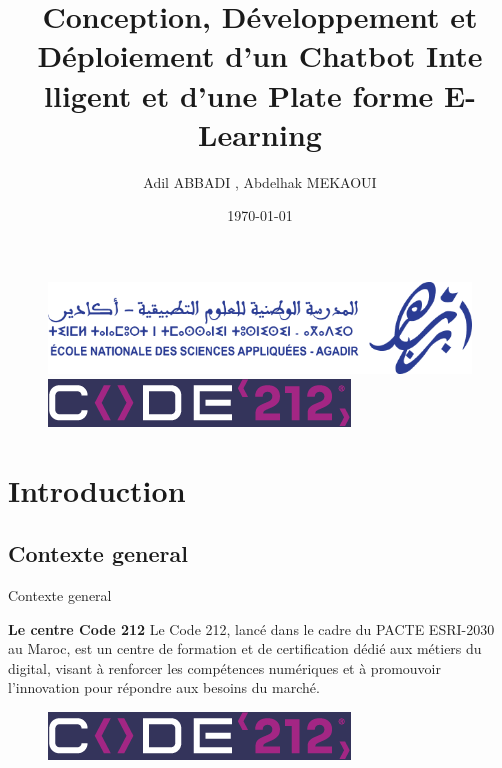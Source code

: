 \documentclass{beamer}
\author{Adil ABBADI , Abdelhak MEKAOUI}
\title{Conception, Développement et Déploiement d'un Chatbot Inte lligent et d'une Plate forme E-Learning}
\institute{ENSA Agadir}
\date{\today}
\begin{document}




\begin{frame}

  \begin{figure}[htpb]
        \begin{center}
         \includegraphics[width=0.45\linewidth]{pic/logo.png}
          \hspace{0.05\linewidth}
            \includegraphics[width=0.45\linewidth]{pic/code.png}
        \end{center}
    \end{figure}
    
    \titlepage
  
\end{frame}


\begin{frame}
    \tableofcontents[sectionstyle=show,subsectionstyle=show/shaded/hide,subsubsectionstyle=show/shaded/hide]
\end{frame}

\section{Introduction}

\subsection{Contexte general}
\begin{frame}{Contexte general}



 
    \vspace{0.5cm} %
    \begin{block}{\centering \textbf{\Large Le centre Code 212}}
        \centering
        \vspace{0.2cm} %
        Le Code 212, lancé dans le cadre du PACTE ESRI-2030 au Maroc, est un centre de formation et de certification dédié aux métiers du digital, visant à renforcer les compétences numériques et à promouvoir l’innovation pour répondre aux besoins du marché.
    \end{block}

\begin{figure}[htpb]
        \centering
        \includegraphics[width=0.45\linewidth]{pic/code.png}
    \end{figure}
\end{frame}
\end{document}

